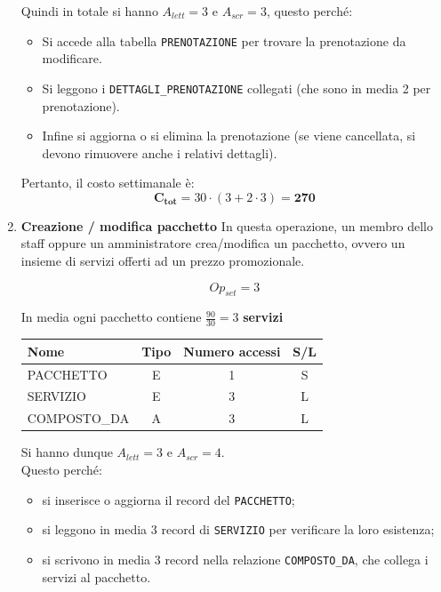 \documentclass[a4paper,12pt]{report}
\begin{document}
\begin{enumerate}
    Quindi in totale si hanno $A_{lett}=3$ e $A_{scr}=3$, questo perché:
    \begin{itemize}
        \item Si accede alla tabella \texttt{PRENOTAZIONE} per trovare la prenotazione da modificare.
        \item Si leggono i \texttt{DETTAGLI\_PRENOTAZIONE} collegati (che sono in media 2 per prenotazione).
        \item Infine si aggiorna o si elimina la prenotazione (se viene cancellata, si devono rimuovere anche i relativi dettagli).
    \end{itemize}

    Pertanto, il costo settimanale è:
    $$
    \mathbf{C_{tot}} = 30 \cdot (3 + 2 \cdot 3) = \mathbf{270}
    $$

        
	\item {\large \textbf{Creazione / modifica pacchetto} \label{op5}}
    In questa operazione, un membro dello staff oppure un amministratore crea/modifica un pacchetto, ovvero un insieme di servizi offerti ad un prezzo promozionale.
    
    $$
    {Op}_{set}=3
    $$
    
    In media ogni pacchetto contiene $\frac{90}{30}=3$ \textbf{servizi}
    
    \begin{table}[H]
    \centering
    \small
    \renewcommand{\arraystretch}{1.15}
    \begin{tabularx}{0.8\textwidth}{|X|c|c|c|}
        \hline
        \rowcolor{gray!20}
        \textbf{Nome} & \textbf{Tipo} & \textbf{Numero accessi} & \textbf{S/L} \\
        \hline
        PACCHETTO & E & 1 & S \\
        SERVIZIO & E & 3 & L\\
        COMPOSTO\_DA & A & 3 & L \\
        \hline
    \end{tabularx}
	\end{table}
    Si hanno dunque $A_{lett}=3$ e $A_{scr}=4$. \\
    Questo perché:
	\begin{itemize}
    \item si inserisce o aggiorna il record del \texttt{PACCHETTO};
    \item si leggono in media 3 record di \texttt{SERVIZIO} per verificare la loro esistenza;
    \item si scrivono in media 3 record nella relazione \texttt{COMPOSTO\_DA}, che collega i 	servizi al pacchetto.
  \end{itemize}


\end{enumerate}
\end{document}
